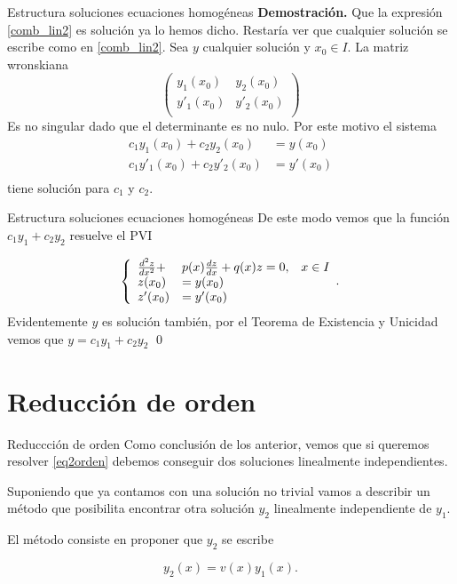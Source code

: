 \documentclass[handout,hyperref={colorlinks=true}]{beamer}
\newcommand{\nl}{\onslide<+-> }
\begin{document}
\begin{frame}{Estructura soluciones ecuaciones homogéneas}
\textbf{Demostración.} Que la expresión \eqref{comb_lin2} es solución ya lo hemos dicho.   Restaría ver que cualquier solución se escribe como en \eqref{comb_lin2}. 
Sea $y$ cualquier solución y $x_0\in I$. La matriz wronskiana
\[\begin{pmatrix}
   y_1(x_0)  & y_2(x_0)\\
   y'_1(x_0)  & y'_2(x_0)\\   
  \end{pmatrix}
\]
Es no singular dado que el determinante es no nulo. Por este motivo el sistema
\[ \begin{split}
  c_1 y_1(x_0) + c_2y_2(x_0) &=y(x_0)\\
   c_1y'_1(x_0)  + c_2y'_2(x_0) &=y'(x_0)\\
  \end{split}
\]
tiene solución para $c_1$ y $c_2$. 
\end{frame}


\begin{frame}{Estructura soluciones ecuaciones homogéneas}
De este modo vemos que la función  $c_1y_1+c_2y_2$ resuelve el PVI

 \[\left\{
 \begin{array}{l l l}
   \frac{d^2z}{dx^2}+&p(x)\frac{dz}{dx}+q(x)z=0,&x\in I\\
   z(x_0)&=y(x_0)&\\
   z'(x_0)&=y'(x_0)&\\ 
  \end{array}.\right.
\]
Evidentemente $y$ es solución también, por el Teorema de Existencia y Unicidad vemos que $y=c_1y_1+c_2y_2$ \qed
\end{frame}

\section{Reducción de orden}
\begin{frame}{Reduccción de orden}
\nl Como conclusión de los anterior, vemos que si queremos resolver \eqref{eq2orden} debemos conseguir  dos soluciones linealmente independientes.

\nl Suponiendo que ya contamos con una solución no trivial vamos a describir un método 
  que posibilita  encontrar otra solución $y_2$ linealmente independiente de $y_1$. 
  
\nl El método consiste en proponer que $y_2$ se escribe

\[\boxed{y_2(x)=v(x)y_1(x)}.\]


\end{frame}
\end{document}
